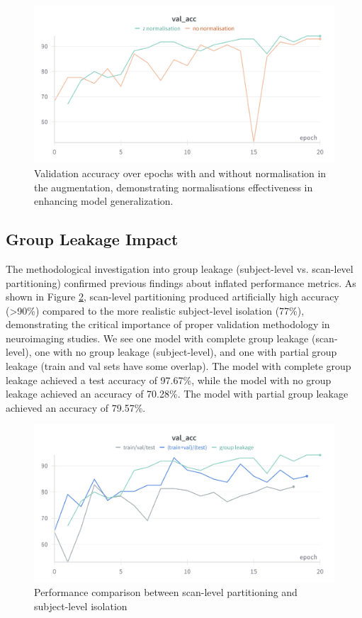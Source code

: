 \documentclass[12pt, a4paper]{article}
\begin{document}
\begin{figure}[htbp]
  \centering
  \includegraphics[width=\textwidth]{figures/znorm_val_acc.png}
  \caption{Validation accuracy over epochs with and without normalisation in the augmentation, demonstrating normalisations effectiveness in enhancing model generalization.}
  \label{fig:normalisation_accuracy}
\end{figure}

\subsection{Group Leakage Impact}

The methodological investigation into group leakage (subject-level vs. scan-level partitioning) confirmed previous findings about inflated performance metrics. As shown in Figure \ref{fig:group_leakage}, scan-level partitioning produced artificially high accuracy (>90\%) compared to the more realistic subject-level isolation (77\%), demonstrating the critical importance of proper validation methodology in neuroimaging studies. We see one model with complete group leakage (scan-level), one with no group leakage (subject-level), and one with partial group leakage (train and val sets have some overlap). The model with complete group leakage achieved a test accuracy of 97.67\%, while the model with no group leakage achieved an accuracy of 70.28\%. The model with partial group leakage achieved an accuracy of 79.57\%.

\begin{figure}[htbp]
  \centering
  \includegraphics[width=\textwidth]{figures/leakage.png}
  \caption{Performance comparison between scan-level partitioning and subject-level isolation}
  \label{fig:group_leakage}
\end{figure}
\end{document}
